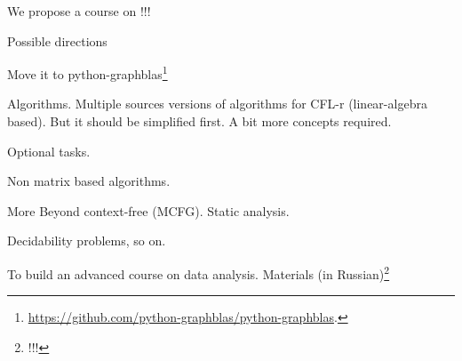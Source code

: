 \documentclass[sigconf]{acmart}
\begin{document}
We propose a course on !!! 

Possible directions 

Move it to python-graphblas\footnote{\url{https://github.com/python-graphblas/python-graphblas}.}

Algorithms. Multiple sources versions of algorithms for CFL-r (linear-algebra based).
But it should be simplified first.
A bit more concepts required.

Optional tasks. 

Non matrix based algorithms.

More Beyond context-free (MCFG). 
Static analysis.

Decidability problems, so on.

To build an advanced course on data analysis. 
Materials (in Russian)\footnote{!!!}



\end{document}
